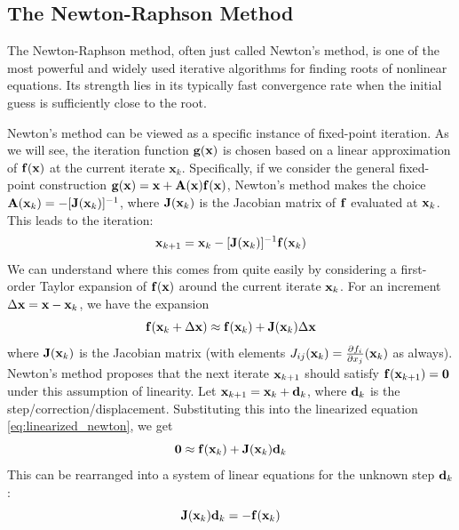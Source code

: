 \subsection{The Newton-Raphson Method}
The Newton-Raphson method, often just called Newton's method, is one of the most powerful and widely used iterative algorithms for finding roots of nonlinear equations. Its strength lies in its typically fast convergence rate when the initial guess is sufficiently close to the root.

Newton's method can be viewed as a specific instance of fixed-point iteration. As we will see, the iteration function $\mathbf{g}(\mathbf{x})$ is chosen based on a linear approximation of $\mathbf{f}(\mathbf{x})$ at the current iterate $\mathbf x_k$. Specifically, if we consider the general fixed-point construction $\mathbf{g}(\mathbf{x}) = \mathbf{x} + \mathbf{A}(\mathbf{x})\mathbf{f}(\mathbf{x})$, Newton's method makes the choice $\mathbf{A}(\mathbf{x}_k) = -[\mathbf{J}(\mathbf{x}_k)]^{-1}$, where $\mathbf{J}(\mathbf{x}_k)$ is the Jacobian matrix of $\mathbf{f}$ evaluated at $\mathbf{x}_k$. This leads to the iteration:
\begin{equation}
    \mathbf{x}_{k+1} = \mathbf{x}_k - [\mathbf{J}(\mathbf{x}_k)]^{-1} \mathbf{f}(\mathbf{x}_k)
\end{equation}
We can understand where this comes from quite easily by considering a first-order Taylor expansion of $\mathbf{f}(\mathbf{x})$ around the current iterate $\mathbf{x}_k$. For an increment $\Delta\mathbf{x} = \mathbf{x} - \mathbf{x}_k$, we have the expansion
\begin{equation}
    \mathbf{f}(\mathbf{x}_k + \Delta\mathbf{x}) \approx \mathbf{f}(\mathbf{x}_k) + \mathbf{J}(\mathbf{x}_k) \Delta\mathbf{x}
    \label{eq:linearized_newton}
\end{equation}
where $\mathbf{J}(\mathbf{x}_k)$ is the Jacobian matrix (with elements $J_{ij}(\mathbf{x}_k) = \tfrac{\partial f_i}{\partial x_j}(\mathbf{x}_k)$ as always). Newton's method proposes that the next iterate $\mathbf{x}_{k+1}$ should satisfy $\mathbf{f}(\mathbf{x}_{k+1}) = \mathbf{0}$ under this assumption of linearity. Let $\mathbf{x}_{k+1} = \mathbf{x}_k + \mathbf{d}_k$, where $\mathbf{d}_k$ is the step/correction/displacement. Substituting this into the linearized equation \ref{eq:linearized_newton}, we get
\begin{equation}
    \mathbf{0} \approx \mathbf{f}(\mathbf{x}_k) + \mathbf{J}(\mathbf{x}_k) \mathbf{d}_k
\end{equation}
This can be rearranged into a system of linear equations for the unknown step $\mathbf{d}_k$:
\begin{equation}
    \mathbf{J}(\mathbf{x}_k) \mathbf{d}_k = -\mathbf{f}(\mathbf{x}_k)
\end{equation}
